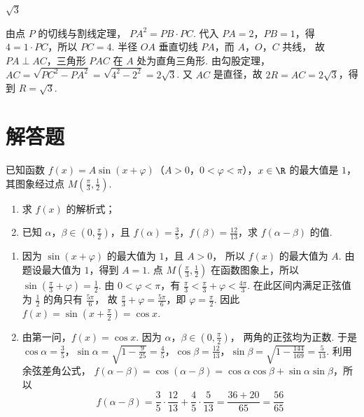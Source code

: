 \begin{answer}
\(\sqrt{3}\)
\end{answer}

\begin{solution}
由点 \(P\) 的切线与割线定理，
\(PA^2=PB\cdot PC\). 代入 \(PA=2\)，\(PB=1\)，得
\(4=1\cdot PC\)，所以 \(PC=4\).
半径 \(OA\) 垂直切线 \(PA\)，而 \(A\)，\(O\)，\(C\) 共线，
故 \(PA\perp AC\)，三角形 \(PAC\) 在 \(A\) 处为直角三角形.
由勾股定理，
\(AC=\sqrt{PC^2-PA^2}=\sqrt{4^2-2^2}=2\sqrt3\).
又 \(AC\) 是直径，故 \(2R=AC=2\sqrt3\)，得到 \(R=\sqrt3\).
\end{solution}

\section{解答题}

\begin{problem}
已知函数 \(f(x) = A \sin (x + \varphi)\)（\(A > 0\)，\(0 < \varphi < \pi\)），\(x \in \R\) 的最大值是 \(1\)，其图象经过点 \(M\left( \frac{\pi}{3}, \frac{1}{2} \right)\).

\begin{enumerate}
\item 求 \(f(x)\) 的解析式；
\item 已知 \(\alpha\)，\(\beta \in \left( 0, \frac{\pi}{2} \right)\)，且 \(f(\alpha) = \frac{3}{5}\)，\(f(\beta) = \frac{12}{13}\)，求 \(f(\alpha - \beta)\) 的值.
\end{enumerate}
\end{problem}

\begin{solution}
\begin{enumerate}
\item 因为 \(\sin(x+\varphi)\) 的最大值为 \(1\)，且 \(A>0\)，
所以 \(f(x)\) 的最大值为 \(A\). 由题设最大值为 \(1\)，得到 \(A=1\).
点 \(M\left(\frac\pi3,\frac12\right)\) 在函数图象上，所以
\(\sin\left(\frac\pi3+\varphi\right)=\frac12\).
由 \(0<\varphi<\pi\)，有
\(\frac\pi3<\frac\pi3+\varphi<\frac{4\pi}3\).
在此区间内满足正弦值为 \(\frac12\) 的角只有 \(\frac{5\pi}6\)，
故 \(\frac\pi3+\varphi=\frac{5\pi}6\)，即 \(\varphi=\frac\pi2\).
因此 \(f(x)=\sin\left(x+\frac\pi2\right)=\cos x\).

\item 由第一问，\(f(x)=\cos x\). 因为 \(\alpha\)，\(\beta\in\left(0,\frac\pi2\right)\)，
两角的正弦均为正数. 于是
\(\cos\alpha=\frac35\)，\(\sin\alpha=\sqrt{1-\frac9{25}}=\frac45\)，\(\cos\beta=\frac{12}{13}\)，\(\sin\beta=\sqrt{1-\frac{144}{169}}=\frac5{13}\).
利用余弦差角公式，
\(f(\alpha-\beta)=\cos(\alpha-\beta)
=\cos\alpha\cos\beta+\sin\alpha\sin\beta\)，所以
\[
f(\alpha-\beta)=\frac35\cdot\frac{12}{13}+\frac45\cdot\frac5{13}
=\frac{36+20}{65}=\frac{56}{65}
\]
\end{enumerate}
\end{solution}

